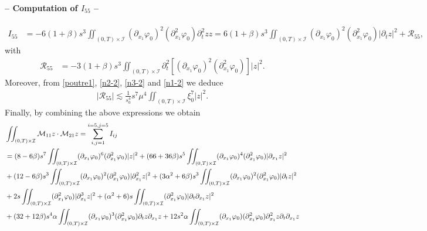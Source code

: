 \documentclass[a4paper, 12pt]{article}
\theoremstyle{plain}
\theoremstyle{definition}
\numberwithin{theorem}{section}
\numberwithin{equation}{section}
\begin{document}
{\paragraph{-- Computation of $I_{55}$ --}
\begin{align*}
I_{55}&=-6(1+\beta)s^3\iint_{(0,T)\times\mathcal{I}}(\partial_{x_1}\varphi_0)^2(\partial^2_{x_1}\varphi_0)\partial^2_tzz=6(1+\beta)s^3\iint_{(0,T)\times\mathcal{I}}(\partial_{x_1}\varphi_0)^2(\partial^2_{x_1}\varphi_0)|\partial_tz|^2+\mathcal{R}_{55},
\end{align*}
with
\begin{align*}
\mathcal{R}_{55}&=-3(1+\beta)s^3\iint_{(0,T)\times\mathcal{I}}\partial_t^2[(\partial_{x_1}\varphi_0)^2(\partial^2_{x_1}\varphi_0)]|z|^2.
\end{align*} 
Moreover, from \eqref{poutre1}, \eqref{n2-2}, \eqref{n3-2} and \eqref{n1-2} we deduce
\begin{align}
|\mathcal{R}_{55}|\lesssim \frac{1}{s_0^4}s^7\mu^4 \iint_{(0,T)\times\mathcal{I}}\xi_0^7|z|^2\label{EstR55}.
\end{align} 
Finally, by combining the above expressions we obtain
\begin{align} \label{produit-croise}
&\iint_{(0,T)\times\mathcal{I}}\mathcal{M}_{11} z\cdot \mathcal{M}_{21} z=\sum\limits_{i,j=1}^{i=5,j=5}I_{ij}\\ 
 \notag
&=(8-6\beta)s^7\iint_{(0,T)\times\mathcal{I}} (\partial_{x_1}\varphi_0)^6(\partial^2_{x_1}\varphi_0)|z|^2+(66+36\beta)s^5\iint_{(0,T)\times\mathcal{I}}(\partial_{x_1}\varphi_0)^4(\partial_{x_1}^2\varphi_0)|\partial_{x_1}z|^2\\ \notag
&+(12-6\beta)s^3\iint_{(0,T)\times\mathcal{I}}(\partial_{x_1}\varphi_0)^2(\partial^2_{x_1}\varphi_0)|\partial^2_{x_1}z|^2+(3\alpha^2+6\beta)s^3\iint_{(0,T)\times\mathcal{I}}(\partial_{x_1}\varphi_0)^2(\partial^2_{x_1}\varphi_0)|\partial_tz|^2\\ \notag
&+2s\iint_{(0,T)\times\mathcal{I}}(\partial^2_{x_1}\varphi_0)|\partial^3_{x_1}z|^2+(\alpha^2+6)s\iint_{(0,T)\times\mathcal{I}}(\partial^2_{x_1}\varphi_0)|\partial_t\partial_{x_1}z|^2\\ \notag
&+(32+12\beta)s^4\alpha\iint_{(0,T)\times\mathcal{I}}(\partial_{x_1}\varphi_0)^3(\partial^2_{x_1}\varphi_0)\partial_tz\partial_{x_1}z+12s^2\alpha\iint_{(0,T)\times\mathcal{I}}(\partial_{x_1}\varphi_0)(\partial^2_{x_1}\varphi_0)\partial^2_{x_1}z\partial_t\partial_{x_1}z\\

\end{align}}
\end{document}
